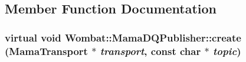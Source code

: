 \subsection{Member Function Documentation}
\hypertarget{classWombat_1_1MamaDQPublisher_a400bad2aad6fde5e1c471160655980b8}{
\subsubsection[{create}]{\setlength{\rightskip}{0pt plus 5cm}virtual void Wombat::MamaDQPublisher::create ({\bf MamaTransport} $\ast$ {\em transport}, \/  const char $\ast$ {\em topic})}}
\label{classWombat_1_1MamaDQPublisher_a400bad2aad6fde5e1c471160655980b8}


